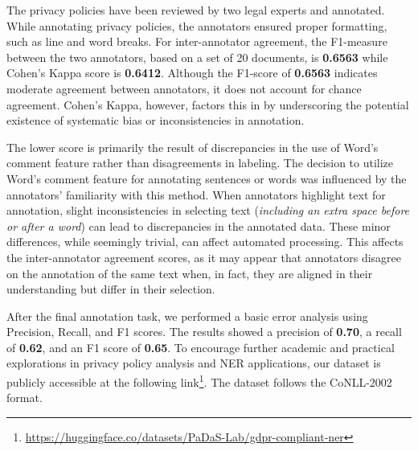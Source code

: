 \documentclass[a4paper,
               biblatex,     %
               hyphens,      %
               ]{jacow}
\begin{document}
The privacy policies have been reviewed by two legal experts and annotated. While annotating privacy policies, the annotators ensured proper formatting, such as line and word breaks. For inter-annotator agreement, the F1-measure between the two annotators, based on a set of 20 documents, is \textbf{0.6563} while Cohen's Kappa score is \textbf{0.6412}. Although the F1-score of \textbf{0.6563} indicates moderate agreement between annotators, it does not account for chance agreement. Cohen’s Kappa, however, factors this in by underscoring the potential existence of systematic bias or inconsistencies in annotation. 

The lower score is primarily the result of discrepancies in the use of Word's comment feature rather than disagreements in labeling. The decision to utilize Word's comment feature for annotating sentences or words was influenced by the annotators' familiarity with this method. When annotators highlight text for annotation, slight inconsistencies in selecting text (\textit{including an extra space before or after a word}) can lead to discrepancies in the annotated data. These minor differences, while seemingly trivial, can affect automated processing. This affects the inter-annotator agreement scores, as it may appear that annotators disagree on the annotation of the same text when, in fact, they are aligned in their understanding but differ in their selection.

After the final annotation task, we performed a basic error analysis using Precision, Recall, and F1 scores. The results showed a precision of \textbf{0.70}, a recall of \textbf{0.62}, and an F1 score of \textbf{0.65}. To encourage further academic and practical explorations in privacy policy analysis and NER applications, our dataset is publicly accessible at the following link\footnote{\url{https://huggingface.co/datasets/PaDaS-Lab/gdpr-compliant-ner}}. The dataset follows the CoNLL-2002 \cite{tjong-kim-sang-2002-introduction} format.


\end{document}
